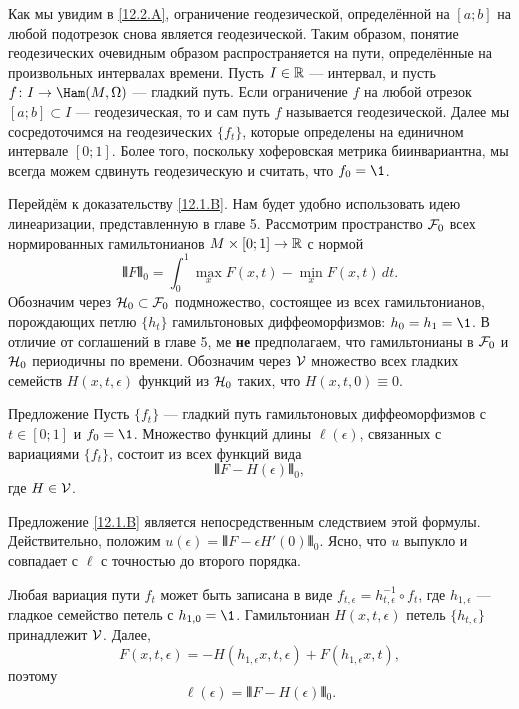 Как мы увидим в \ref{12.2.A}, ограничение геодезической, определённой на $[a; b]$ на любой подотрезок снова является геодезической.
Таким образом, понятие геодезических очевидным образом распространяется на пути, определённые на произвольных интервалах времени.
Пусть $I\in \mathbb{R}$ --- интервал, и пусть $f\: I\to\Ham(M,\Omega)$ --- гладкий путь.
Если ограничение $f$ на любой отрезок $[a; b] \subset I$ --- геодезическая, то и сам путь $f$ называется геодезической.
Далее мы сосредоточимся на геодезических $\{f_t\}$, которые определены на единичном интервале $[0; 1]$.
Более того, поскольку хоферовская метрика биинвариантна, мы всегда можем сдвинуть геодезическую и считать, что $f_0 = \1$. 

Перейдём к доказательству \ref{12.1.B}.
Нам будет удобно использовать идею линеаризации, представленную в главе 5.
Рассмотрим пространство $\mathcal{F}_0$ всех нормированных гамильтонианов $M \times [0; 1] \to \mathbb{R}$
с нормой 
\[\VERT F \VERT_0 = \int_0^1 \max_x F(x,t) - \min_x F(x,t)\, dt.\]
Обозначим через $\mathcal{H}_0 \subset \mathcal{F}_0$ подмножество, состоящее из всех гамильтонианов, порождающих петлю $\{h_t\}$ гамильтоновых диффеоморфизмов: $h_0 = h_1 = \1$.
В отличие от соглашений в главе 5,
ме \textbf{не} предполагаем, что гамильтонианы в $\mathcal{F}_0$ и $\mathcal{H}_0$ периодичны по времени.
Обозначим через \index[symb]{$\V$}$\V$ множество всех гладких семейств $H(x, t, \epsilon)$ функций из $\mathcal{H}_0$ таких, что $H(x, t, 0) \equiv 0$.

\begin{thm}{Предложение}\label{12.1.E}
Пусть $\{f_t\}$ --- гладкий путь гамильтоновых диффеоморфизмов с $t \in [0; 1]$ и $f_0 = \1$.
Множество функций длины $\ell(\epsilon)$, связанных с вариациями $\{f_t\}$, состоит из всех функций вида 
\[\VERT F - H(\epsilon)\VERT_0,\]
где $H\in\mathcal{V}$.
\end{thm}

Предложение \ref{12.1.B} является непосредственным следствием этой формулы.
Действительно, положим $u(\epsilon) = \VERT F - \epsilon H'(0)\VERT_0$.
Ясно, что $u$ выпукло и совпадает с $\ell$ с точностью до второго порядка.

Любая вариация пути $f_t$ может быть записана в виде $f_{t,\epsilon} = h_{t,\epsilon}^{-1}\circ f_t$, где $h_{1,\epsilon}$ --- гладкое семейство петель с $h_{1,0} = \1$.
Гамильтониан $H(x,t,\epsilon)$ петель $\{h_{t,\epsilon}\}$ принадлежит $\V$.
Далее, 
\[F(x, t, \epsilon) = -H(h_{1,\epsilon}x, t, \epsilon) + F(h_{1,\epsilon}x, t),\]
поэтому
\[\ell(\epsilon) = \VERT F - H(\epsilon)\VERT_0.\]
\qeds

